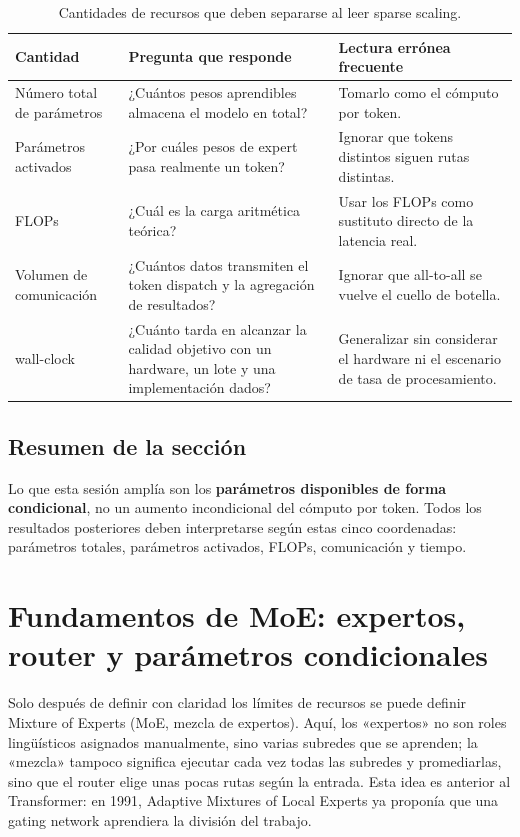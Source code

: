 \documentclass[a4paper]{article}
\begin{document}
\begin{table}[H]
\centering
\small
\caption{Cantidades de recursos que deben separarse al leer sparse scaling.}
\begin{tabularx}{\textwidth}{L{0.22\textwidth}X X}
\toprule
Cantidad & Pregunta que responde & Lectura errónea frecuente \\
\midrule
Número total de parámetros & ¿Cuántos pesos aprendibles almacena el modelo en total? & Tomarlo como el cómputo por token. \\
Parámetros activados & ¿Por cuáles pesos de expert pasa realmente un token? & Ignorar que tokens distintos siguen rutas distintas. \\
FLOPs & ¿Cuál es la carga aritmética teórica? & Usar los FLOPs como sustituto directo de la latencia real. \\
Volumen de comunicación & ¿Cuántos datos transmiten el token dispatch y la agregación de resultados? & Ignorar que all-to-all se vuelve el cuello de botella. \\
wall-clock & ¿Cuánto tarda en alcanzar la calidad objetivo con un hardware, un lote y una implementación dados? & Generalizar sin considerar el hardware ni el escenario de tasa de procesamiento. \\
\bottomrule
\end{tabularx}
\end{table}

\subsection{Resumen de la sección}

Lo que esta sesión amplía son los \textbf{parámetros disponibles de forma condicional}, no un aumento incondicional del cómputo por token. Todos los resultados posteriores deben interpretarse según estas cinco coordenadas: parámetros totales, parámetros activados, FLOPs, comunicación y tiempo.
\section{Fundamentos de MoE: expertos, router y parámetros condicionales}

Solo después de definir con claridad los límites de recursos se puede definir Mixture of Experts (MoE, mezcla de expertos). Aquí, los «expertos» no son roles lingüísticos asignados manualmente, sino varias subredes que se aprenden; la «mezcla» tampoco significa ejecutar cada vez todas las subredes y promediarlas, sino que el router elige unas pocas rutas según la entrada. Esta idea es anterior al Transformer: en 1991, Adaptive Mixtures of Local Experts ya proponía que una gating network aprendiera la división del trabajo.
\end{document}
